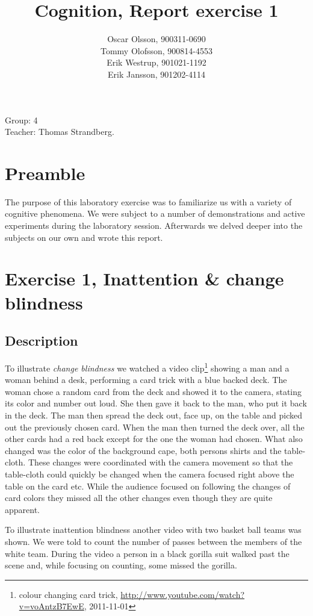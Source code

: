 \documentclass[10pt, a4paper]{article}
\title{Cognition, Report exercise 1}
\date{}
\author{Oscar Olsson, 900311-0690\\ Tommy Olofsson, 900814-4553\\
	Erik Westrup, 901021-1192\\ Erik Jansson, 901202-4114}
\begin{document}
\maketitle
\begin{center}
Group: 4 \\
Teacher: Thomas Strandberg.
\end{center}
\newpage

\section{Preamble}
The purpose of this laboratory exercise was to familiarize us with a variety of cognitive phenomena. We were subject to a number of demonstrations and active experiments during the laboratory session. Afterwards we delved deeper into the subjects on our own and wrote this report.

\section{Exercise 1, Inattention \& change blindness}
\subsection{Description}
To illustrate \emph{change blindness} we watched a video clip\footnote{colour changing card trick, \url{http://www.youtube.com/watch?v=voAntzB7EwE}, 2011-11-01} showing a man and a woman behind a desk, performing a card trick with a blue backed deck. The woman chose a random card from the deck and showed it to the camera, stating its color and number out loud. She then gave it back to the man, who put it back in the deck. The man then spread the deck out, face up, on the table and picked out the previously chosen card. When the man then turned the deck over, all the other cards had a red back except for the one the woman had chosen. What also changed was the color of the background cape, both persons shirts and the table-cloth. These changes were coordinated with the camera movement so that the table-cloth could quickly be changed when the camera focused right above the table on the card etc. While the audience focused on following the changes of card colors they missed all the other changes even though they are quite apparent.

To illustrate inattention blindness another video with two basket ball teams was shown. We were told to count the number of passes between the members of the white team. During the video a person in a black gorilla suit walked past the scene and, while focusing on counting, some missed the gorilla.
\end{document}

